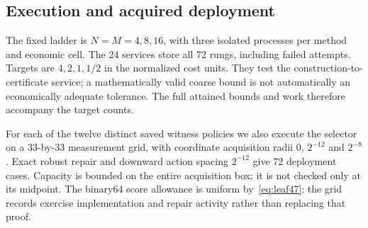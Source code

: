 \subsection{Execution and acquired deployment}
The fixed ladder is $N=M=4,8,16$, with three isolated processes per method and economic cell. The 24 services store all 72 rungs, including failed attempts. Targets are $4,2,1,1/2$ in the normalized cost units. They test the construction-to-certificate service; a mathematically valid coarse bound is not automatically an economically adequate tolerance. The full attained bounds and work therefore accompany the target counts.



For each of the twelve distinct saved witness policies we also execute the selector on a $33$-by-$33$ measurement grid, with coordinate acquisition radii $0$, $2^{-12}$ and $2^{-8}$. Exact robust repair and downward action spacing $2^{-12}$ give 72 deployment cases. Capacity is bounded on the entire acquisition box; it is not checked only at its midpoint. The binary64 score allowance is uniform by~\eqref{eq:leaf47}; the grid records exercise implementation and repair activity rather than replacing that proof.


